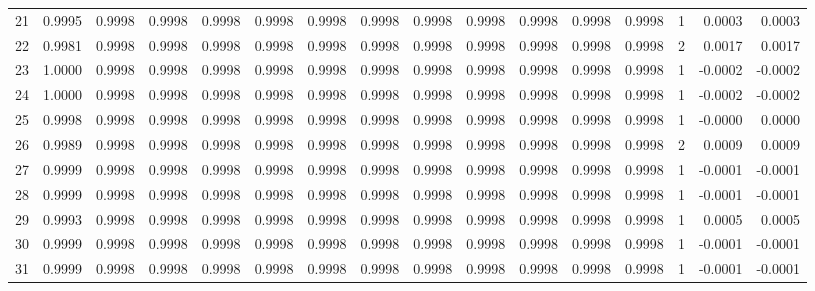 \begin{tabular}{lrrrrrrrrrrrrrrr}
21  &      0.9995 &  0.9998 &  0.9998 &  0.9998 &  0.9998 &  0.9998 &  0.9998 &  0.9998 &  0.9998 &  0.9998 &   0.9998 &     0.9998 &      1 &                    0.0003 &                     0.0003 \\
22  &      0.9981 &  0.9998 &  0.9998 &  0.9998 &  0.9998 &  0.9998 &  0.9998 &  0.9998 &  0.9998 &  0.9998 &   0.9998 &     0.9998 &      2 &                    0.0017 &                     0.0017 \\
23  &      1.0000 &  0.9998 &  0.9998 &  0.9998 &  0.9998 &  0.9998 &  0.9998 &  0.9998 &  0.9998 &  0.9998 &   0.9998 &     0.9998 &      1 &                   -0.0002 &                    -0.0002 \\
24  &      1.0000 &  0.9998 &  0.9998 &  0.9998 &  0.9998 &  0.9998 &  0.9998 &  0.9998 &  0.9998 &  0.9998 &   0.9998 &     0.9998 &      1 &                   -0.0002 &                    -0.0002 \\
25  &      0.9998 &  0.9998 &  0.9998 &  0.9998 &  0.9998 &  0.9998 &  0.9998 &  0.9998 &  0.9998 &  0.9998 &   0.9998 &     0.9998 &      1 &                   -0.0000 &                     0.0000 \\
26  &      0.9989 &  0.9998 &  0.9998 &  0.9998 &  0.9998 &  0.9998 &  0.9998 &  0.9998 &  0.9998 &  0.9998 &   0.9998 &     0.9998 &      2 &                    0.0009 &                     0.0009 \\
27  &      0.9999 &  0.9998 &  0.9998 &  0.9998 &  0.9998 &  0.9998 &  0.9998 &  0.9998 &  0.9998 &  0.9998 &   0.9998 &     0.9998 &      1 &                   -0.0001 &                    -0.0001 \\
28  &      0.9999 &  0.9998 &  0.9998 &  0.9998 &  0.9998 &  0.9998 &  0.9998 &  0.9998 &  0.9998 &  0.9998 &   0.9998 &     0.9998 &      1 &                   -0.0001 &                    -0.0001 \\
29  &      0.9993 &  0.9998 &  0.9998 &  0.9998 &  0.9998 &  0.9998 &  0.9998 &  0.9998 &  0.9998 &  0.9998 &   0.9998 &     0.9998 &      1 &                    0.0005 &                     0.0005 \\
30  &      0.9999 &  0.9998 &  0.9998 &  0.9998 &  0.9998 &  0.9998 &  0.9998 &  0.9998 &  0.9998 &  0.9998 &   0.9998 &     0.9998 &      1 &                   -0.0001 &                    -0.0001 \\
31  &      0.9999 &  0.9998 &  0.9998 &  0.9998 &  0.9998 &  0.9998 &  0.9998 &  0.9998 &  0.9998 &  0.9998 &   0.9998 &     0.9998 &      1 &                   -0.0001 &                    -0.0001 \\

\end{tabular}

